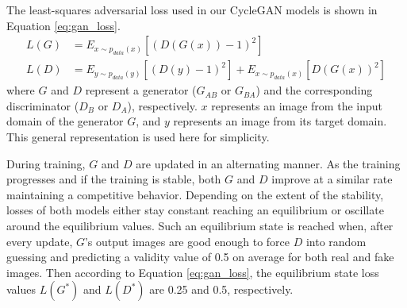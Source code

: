 The least-squares adversarial loss used in our CycleGAN models is shown in Equation \ref{eq:gan_loss}.
\begin{equation}
    \begin{aligned}
    L(G) &= E_{x \sim p_{data}(x)} [(D(G(x)) - 1)^2] \\
    L(D) &= E_{y \sim p_{data}(y)} [(D(y) - 1)^2] + E_{x \sim p_{data}(x)} [D(G(x))^2]
    \end{aligned}
    \label{eq:gan_loss}
\end{equation}
where $G$ and $D$ represent a generator ($G_{AB}$ or $G_{BA}$) and the corresponding discriminator ($D_B$ or $D_A$), respectively. $x$ represents an image from the input domain of the generator $G$, and $y$ represents an image from its target domain. This general representation is used here for simplicity. 

During training, $G$ and $D$ are updated in an alternating manner. As the training progresses and if the training is stable, both $G$ and $D$ improve at a similar rate maintaining a competitive behavior. Depending on the extent of the stability, losses of both models either stay constant reaching an equilibrium or oscillate around the equilibrium values. Such an equilibrium state is reached when, after every update, $G$'s output images are good enough to force $D$ into random guessing and predicting a validity value of 0.5 on average for both real and fake images. Then according to Equation \ref{eq:gan_loss}, the equilibrium state loss values $L(G^*)$ and $L(D^*)$ are 0.25 and 0.5, respectively. 

